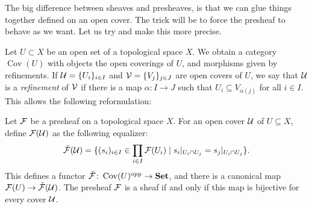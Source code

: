 \documentclass{article}
\DeclareMathOperator{\opp}{opp}
\DeclareMathOperator{\Cov}{Cov}
\begin{document}
The big difference between sheaves and presheaves, is that we can glue
things together defined on an open cover. The trick will be to force
the presheaf to behave as we want. Let us try and make this more precise.

Let $U \subset X$ be an open set of a topological space $X$.
We obtain a category $\Cov(U)$ with objects the open coverings of $U$,
and morphisms given by refinements.
If $\mathcal{U} = \{U_i\}_{i\in I}$ and $\mathcal{V}= \{V_j\}_{j\in J}$ are open covers of $U$, we say that $\mathcal{U}$
is a \emph{refinement} of $\mathcal{V}$ if there is a map $\alpha \colon I \to J$
such that $U_i \subseteq V_{\alpha(j)}$ for all $i\in I$.
This allows the following reformulation:
\begin{lemma}
    Let $\mathcal{F}$ be a presheaf on a topological space $X$.
    For an open cover $\mathcal{U}$ of $U\subseteq X$, define
    $\mathcal{F}(\mathcal{U})$ as the following equalizer:
    \begin{equation*}
        \tilde{\mathcal{F}}(\mathcal{U}) =
        \{(s_i)_{i\in I} \in \prod\limits_{i\in I}\mathcal{F}(U_i)\mid
        s_i|_{U_i \cap U_j} = s_j|_{U_i \cap U_j}\}.
    \end{equation*}
    This defines a functor $\tilde{\mcF} \colon \Cov(U)^{\opp} \to \Set$, and there
    is a canonical map $\mathcal{F}(U) \to \tilde{\mathcal{F}}(\mathcal{U})$.
    The presheaf $\mathcal{F}$ is a sheaf if and only if this map is bijective
    for every cover $\mathcal{U}$.
\end{lemma}
\end{document}

